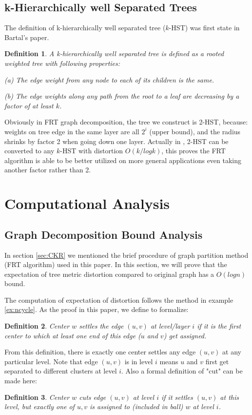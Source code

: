 \documentclass[11pt,twoside, onecolumn]{IEEEtran}
\newtheorem{Definition}{Definition}[section]
\begin{document}
\subsection{k-Hierarchically well Separated Trees}
\label{sec:hst}
The definition of k-hierarchically well separated tree ($k$-HST) was first state in Bartal's paper\cite{hst}.
\begin{Definition}
A {\it k-hierarchically well separated tree} is defined as a rooted weighted tree with following properties:\par
(a) The edge weight from any node to each of its children is the same.\par
(b) The edge weights along any path from the root to a leaf are decreasing by a factor of at least $k$.
\end{Definition}
Obviously in FRT graph decomposition, the tree we construct is 2-HST, because: weights on tree edge in the
same layer are all $2^{i}$ (upper bound), and the radius shrinks by factor 2 when going down one layer.
Actually in \cite{bartal98}, 2-HST can be converted to any $k$-HST with distortion $O(k/logk)$, this
proves the FRT algorithm is able to be better utilized on more general applications 
even taking another factor rather than 2.

\section{Computational Analysis}
\subsection{Graph Decomposition Bound Analysis}
\label{sec:cutbound}
In section \ref{sec:CKR} we mentioned the brief procedure of graph partition method (FRT algorithm) used 
in this paper. In this section, we will prove that the expectation of tree metric distortion compared
to original graph has a $O(log n)$ bound.

The computation of expectation of distortion follows the method in example \ref{ex:ncycle}. As the proof
in this paper, we define to formalize:
\begin{Definition}
Center $w$ \emph{settles} the edge $(u,v)$ at level/layer $i$ if it is the first center to which at least one 
end of this edge ($u$ and $v$) get assigned.
\end{Definition}

From this definition, there is exactly one center settles any edge $(u,v)$ at any particular level.
Note that edge $(u,v)$ is in level $i$ means $u$ and $v$ first get separated to different clusters at level $i$.
Also a formal definition of "cut" can be made here:
\begin{Definition}
Center $w$ \emph{cuts} edge $(u,v)$ at level $i$ if it settles $(u,v)$ at this level, but exactly one
of $u,v$ is assigned to (included in ball) $w$ at level $i$.
\end{Definition}
\end{document}
